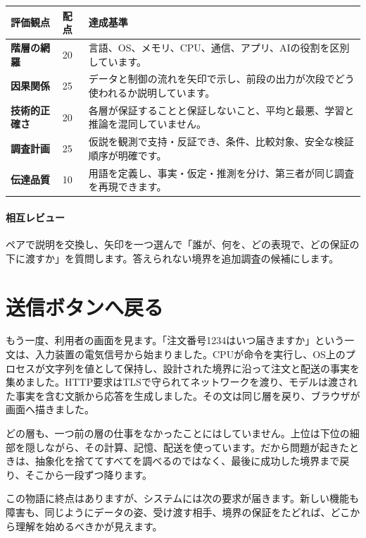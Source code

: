 \begingroup
  \noindent
  \begin{tabularx}{\textwidth}{@{}>{\bfseries}p{25mm}p{14mm}Y@{}}
    \toprule
    評価観点 & 配点 & 達成基準 \\
    \midrule
    階層の網羅 & 20 & 言語、OS、メモリ、CPU、通信、アプリ、AIの役割を区別しています。 \\
    因果関係 & 25 & データと制御の流れを矢印で示し、前段の出力が次段でどう使われるか説明しています。 \\
    技術的正確さ & 20 & 各層が保証することと保証しないこと、平均と最悪、学習と推論を混同していません。 \\
    調査計画 & 25 & 仮説を観測で支持・反証でき、条件、比較対象、安全な検証順序が明確です。 \\
    伝達品質 & 10 & 用語を定義し、事実・仮定・推測を分け、第三者が同じ調査を再現できます。 \\
    \bottomrule
  \end{tabularx}
  \vspace{1mm}
\paragraph{相互レビュー}
    ペアで説明を交換し、矢印を一つ選んで「誰が、何を、どの表現で、どの保証の下に渡すか」を質問します。答えられない境界を追加調査の候補にします。

\par
\endgroup


\section{送信ボタンへ戻る}
\label{sec:07-practice-19}

もう一度、利用者の画面を見ます。「注文番号1234はいつ届きますか」という一文は、入力装置の電気信号から始まりました。CPUが命令を実行し、OS上のプロセスが文字列を値として保持し、設計された境界に沿って注文と配送の事実を集めました。HTTP要求はTLSで守られてネットワークを渡り、モデルは渡された事実を含む文脈から応答を生成しました。その文は同じ層を戻り、ブラウザが画面へ描きました。

どの層も、一つ前の層の仕事をなかったことにはしていません。上位は下位の細部を隠しながら、その計算、記憶、配送を使っています。だから問題が起きたときは、抽象化を捨ててすべてを調べるのではなく、最後に成功した境界まで戻り、そこから一段ずつ降ります。

この物語に終点はありますが、システムには次の要求が届きます。新しい機能も障害も、同じようにデータの姿、受け渡す相手、境界の保証をたどれば、どこから理解を始めるべきかが見えます。

